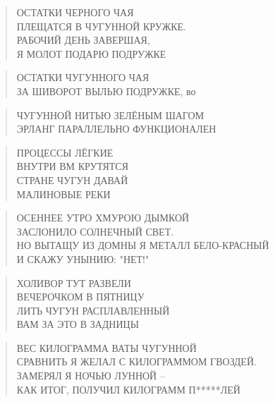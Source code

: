 \poemtitle{***}
\begin{verse}
ОСТАТКИ ЧЕРНОГО ЧАЯ\\
ПЛЕЩАТСЯ В ЧУГУННОЙ КРУЖКЕ.\\
РАБОЧИЙ ДЕНЬ ЗАВЕРШАЯ,\\
Я МОЛОТ ПОДАРЮ ПОДРУЖКЕ
\end{verse}

\poemtitle{***}
\begin{verse}
ОСТАТКИ ЧУГУННОГО ЧАЯ\\
ЗА ШИВОРОТ ВЫЛЬЮ ПОДРУЖКЕ, во
\end{verse}

\poemtitle{***}
\begin{verse}
ЧУГУННОЙ НИТЬЮ ЗЕЛЁНЫМ ШАГОМ\\
ЭРЛАНГ ПАРАЛЛЕЛЬНО ФУНКЦИОНАЛЕН
\end{verse}

\poemtitle{***}
\begin{verse}
ПРОЦЕССЫ ЛЁГКИЕ \\
               ВНУТРИ ВМ КРУТЯТСЯ\\
СТРАНЕ ЧУГУН ДАВАЙ\\
               МАЛИНОВЫЕ РЕКИ
\end{verse}

\poemtitle{***}
\begin{verse}
ОСЕННЕЕ УТРО ХМУРОЮ ДЫМКОЙ\\
ЗАСЛОНИЛО СОЛНЕЧНЫЙ СВЕТ.\\
НО ВЫТАЩУ ИЗ ДОМНЫ Я МЕТАЛЛ БЕЛО-КРАСНЫЙ\\
И СКАЖУ УНЫНИЮ: "НЕТ!"
\end{verse}

\poemtitle{***}
\begin{verse}
ХОЛИВОР ТУТ РАЗВЕЛИ\\
ВЕЧЕРОЧКОМ В ПЯТНИЦУ\\
ЛИТЬ ЧУГУН РАСПЛАВЛЕННЫЙ\\
ВАМ ЗА ЭТО В ЗАДНИЦЫ
\end{verse}

\poemtitle{***}
\begin{verse}
ВЕС КИЛОГРАММА ВАТЫ ЧУГУННОЙ\\
СРАВНИТЬ Я ЖЕЛАЛ С КИЛОГРАММОМ ГВОЗДЕЙ.\\
ЗАМЕРЯЛ Я НОЧЬЮ ЛУННОЙ -- \\
КАК ИТОГ, ПОЛУЧИЛ КИЛОГРАММ П*****ЛЕЙ
\end{verse}

